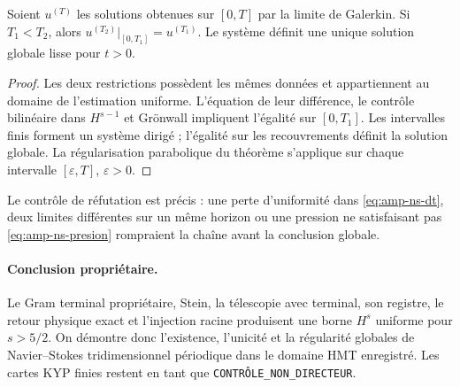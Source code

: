 \begin{proposition}
\label{prop:amp-ns-pegado}
Soient \(u^{(T)}\) les solutions obtenues sur \([0,T]\) par la limite de Galerkin. Si \(T_1<T_2\), alors \(u^{(T_2)}|_{[0,T_1]}=u^{(T_1)}\). Le système définit une unique solution globale lisse pour \(t>0\).
\end{proposition}

\begin{proof}
Les deux restrictions possèdent les mêmes données et appartiennent au domaine de
l'estimation uniforme. L'équation de leur différence, le contrôle bilinéaire dans
\(H^{s-1}\) et Grönwall impliquent l'égalité sur \([0,T_1]\). Les intervalles
finis forment un système dirigé ; l'égalité sur les recouvrements définit
la solution globale. La régularisation parabolique du théorème s'applique sur
chaque intervalle \([\varepsilon,T]\), \(\varepsilon>0\).
\end{proof}

Le contrôle de réfutation est précis : une perte d'uniformité dans
\eqref{eq:amp-ns-dt}, deux limites différentes sur un même horizon ou une
pression ne satisfaisant pas \eqref{eq:amp-ns-presion} rompraient la chaîne avant
la conclusion globale.

\paragraph{Conclusion propriétaire.}
Le Gram terminal propriétaire, Stein, la télescopie avec terminal, son registre,
le retour physique exact et l'injection racine produisent une borne \(H^s\) uniforme pour
\(s>5/2\). On démontre donc l'existence, l'unicité et la régularité
globales de Navier--Stokes tridimensionnel périodique dans le domaine HMT
enregistré. Les cartes KYP finies restent en tant que
\texttt{CONTRÔLE\_NON\_DIRECTEUR}.
